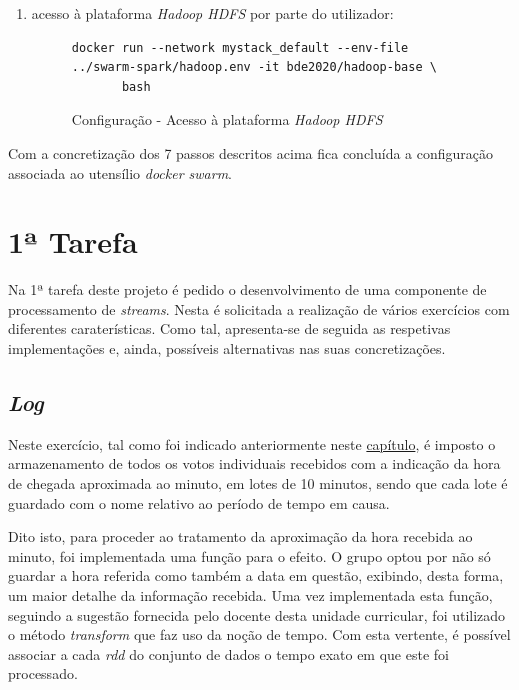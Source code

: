 \documentclass[a4paper]{report}
\begin{document}
{\begin{enumerate}[label=\textbf{\arabic*.}]
            \item acesso à plataforma \textit{Hadoop HDFS} por parte do utilizador:
            \begin{figure}[H]
                \centering
                \begin{verbatim}
docker run --network mystack_default --env-file ../swarm-spark/hadoop.env -it bde2020/hadoop-base \
       bash
                \end{verbatim}
                \vspace{-5mm}
                \caption{Configuração - Acesso à plataforma \textit{Hadoop HDFS}}
                \label{fig:12}
            \end{figure}
        \end{enumerate}}

        Com a concretização dos 7 passos descritos acima fica concluída a configuração associada ao utensílio \textit{docker swarm}.

    \section{1ª Tarefa} \label{sec:Task1}
        Na 1ª tarefa deste projeto é pedido o desenvolvimento de uma componente de processamento de \textit{streams}. Nesta é solicitada a realização de vários exercícios com diferentes caraterísticas. Como tal, apresenta-se de seguida as respetivas implementações e, ainda, possíveis alternativas nas suas concretizações.

        \subsection{\textit{Log}} \label{subsec:Task1-Log}
        Neste exercício, tal como foi indicado anteriormente neste \hyperref[ch:Implementation]{capítulo}, é imposto o armazenamento de todos os votos individuais recebidos com a indicação da hora de chegada aproximada ao minuto, em lotes de 10 minutos, sendo que cada lote é guardado com o nome relativo ao período de tempo em causa.

        Dito isto, para proceder ao tratamento da aproximação da hora recebida ao minuto, foi implementada uma função para o efeito. O grupo optou por não só guardar a hora referida como também a data em questão, exibindo, desta forma, um maior detalhe da informação recebida.
        Uma vez implementada esta função, seguindo a sugestão fornecida pelo docente desta unidade curricular, foi utilizado o método \textit{transform} que faz uso da noção de tempo. Com esta vertente, é possível associar a cada \textit{rdd} do conjunto de dados o tempo exato em que este foi processado.
\end{document}
